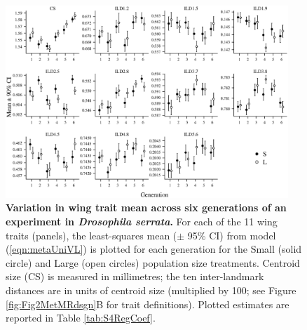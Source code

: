 \newpage
\FloatBarrier
\begin{figure}
    \centering
    \includegraphics[width=0.95\textwidth]{Supp/Chp2_Meta/S3.Mean.eps}
    \caption[Variation in wing trait mean across six generations of an experiment in \textit{Drosophila serrata}.]{\textbf{Variation in wing trait mean across six generations of an experiment in \textit{Drosophila serrata}.} For each of the 11 wing traits (panels), the least-squares mean ($\pm$ 95\% CI) from model (\ref{eqn:metaUniVL}) is plotted for each generation for the Small (solid circle) and Large (open circles) population size treatments. Centroid size (CS) is measured in millimetres; the ten inter-landmark distances are in units of centroid size (multiplied by 100; see Figure \ref{fig:Fig2MetMRdsgn}B for trait definitions). Plotted estimates are reported in Table \ref{tab:S4RegCoef}.}
    \label{fig:S3TraitMean}
\end{figure}

